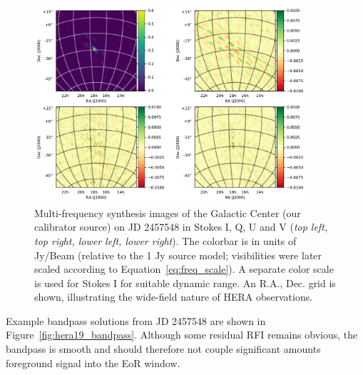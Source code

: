 \begin{figure}
\centering
\includegraphics[width=0.9\textwidth]{chapters/eor_window_HERA/figures/galcen.pdf}
\caption[Multi-frequency synthesis images of the Galactic Center (our calibrator source) on JD 2457548 in Stokes I, Q, U and V.]{
Multi-frequency synthesis images of the Galactic Center (our calibrator source) on JD 2457548 in Stokes I, Q, U and V (\textit{top left, top right, lower left, lower right}). 
The colorbar is in units of Jy/Beam (relative to the 1 Jy source model; visibilities were later scaled according to Equation~\ref{eq:freq_scale}).
A separate color scale is used for Stokes I for suitable dynamic range. An R.A., Dec. grid is shown, illustrating the wide-field nature of HERA observations.
}
\label{fig:hera19_GCimage}
\end{figure}

Example bandpass solutions from JD 2457548 are shown in Figure~\ref{fig:hera19_bandpass}. Although some residual RFI remains obvious, the bandpass is smooth and should therefore not couple significant amounts foreground signal into the EoR window.


